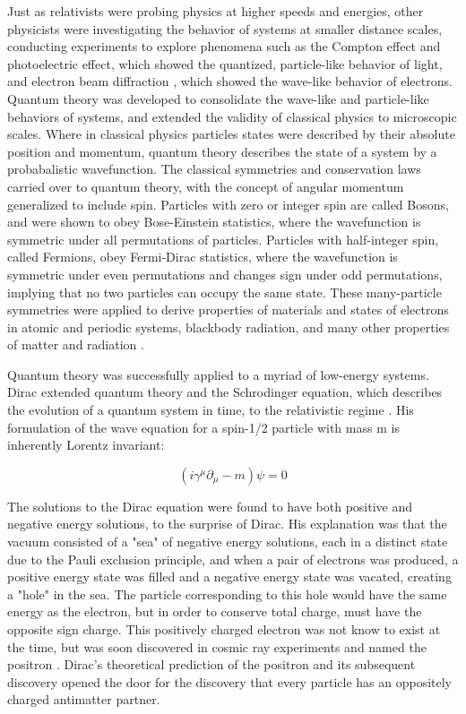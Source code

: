 \indent Just as relativists were probing physics at higher speeds and energies, other physicists were investigating the behavior of systems at smaller distance scales, conducting experiments to explore phenomena such as the Compton effect \cite{PhysRev.21.483} and photoelectric effect\cite{Einstein:1905cc}, which showed the quantized, particle-like behavior of light, and electron beam diffraction \cite{Davisson:1927ta}, which showed the wave-like behavior of electrons. Quantum theory was developed to consolidate the wave-like and particle-like behaviors of systems, and extended the validity of classical physics to microscopic scales. Where in classical physics particles states were described by their absolute position and momentum, quantum theory describes the state of a system by a probabalistic wavefunction. The classical symmetries and conservation laws carried over to quantum theory, with the concept of angular momentum generalized to include spin. Particles with zero or integer spin are called Bosons, and were shown to obey Bose-Einstein statistics, where the wavefunction is symmetric under all permutations of particles. Particles with half-integer spin, called Fermions, obey Fermi-Dirac statistics, where the wavefunction is symmetric under even permutations and changes sign under odd permutations, implying that no two particles can occupy the same state. These many-particle symmetries were applied to derive properties of materials and states of electrons in atomic and periodic systems, blackbody radiation, and many other properties of matter and radiation \cite{Shankar}.

\indent Quantum theory was successfully applied to a myriad of low-energy systems. Dirac extended quantum theory and the Schrodinger equation, which describes the evolution of a quantum system in time, to the relativistic regime \cite{Diracqm}. His formulation of the wave equation for a spin-1/2 particle with mass m is inherently Lorentz invariant:

\begin{equation}
(i \gamma^\mu \partial_\mu - m)\psi = 0
\end{equation}

The solutions to the Dirac equation were found to have both positive and negative energy solutions, to the surprise of Dirac. His explanation was that the vacuum consisted of a "sea" of negative energy solutions, each in a distinct state due to the Pauli exclusion principle, and when a pair of electrons was produced, a positive energy state was filled and a negative energy state was vacated, creating a "hole" in the sea. The particle corresponding to this hole would have the same energy as the electron, but in order to conserve total charge, must have the opposite sign charge. This positively charged electron was not know to exist at the time, but was soon discovered in cosmic ray experiments and named the positron \cite{PhysRev.43.491}. Dirac's theoretical prediction of the positron and its subsequent discovery opened the door for the discovery that every particle has an oppositely charged antimatter partner. 

